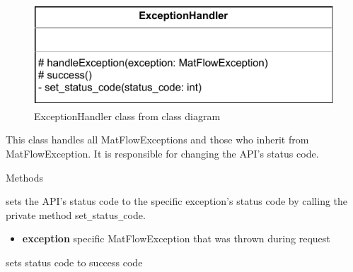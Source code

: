 
\begin{figure}[h]
        \centerline{\includegraphics[scale=1]{res/Klassen/ExceptionHandler.pdf}}
        \caption{ExceptionHandler class from class diagram}
\end{figure}

This class handles all MatFlowExceptions and those who inherit from MatFlowException. It is  
responsible for changing the API's status code.

\begin{methodenv}{Methods}

sets the API's status code to the specific exception's status code by calling the private method
set\texttt{\_}status\texttt{\_}code.
\begin{itemize}
        \item \textbf{exception}
        specific MatFlowException that was thrown during request
\end{itemize}

sets status code to success code

\end{methodenv}

\newpage